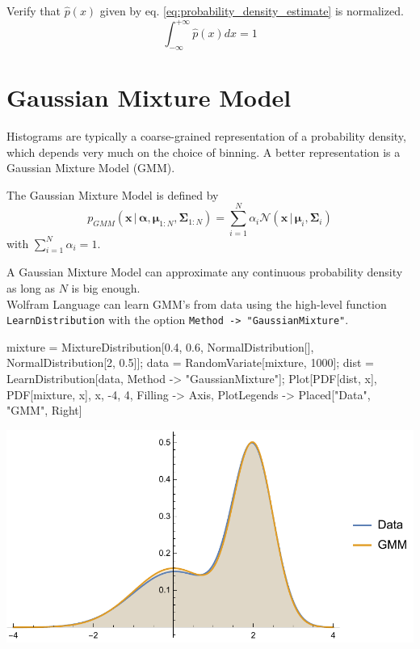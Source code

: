 \documentclass{tstextbook}
\begin{document}
\begin{exercise}
Verify that $\hat{p}(x)$ given by eq. \ref{eq:probability_density_estimate} is normalized.
  \begin{equation}
\int_{-\infty}^{+\infty}\hat{p}(x)dx=1        
  \end{equation}
\end{exercise}

\section{Gaussian Mixture Model}
Histograms are typically a coarse-grained representation of a probability density, which depends very much on the choice of binning. A better representation is a Gaussian Mixture Model (GMM). 

\begin{definition}
  \label{th:gaussianmixturemodel}
  The Gaussian Mixture Model is defined by
  \begin{equation}
    p_{GMM}(\mathbf{x}\,\vert\,\boldsymbol{\alpha},\boldsymbol{\mu}_{1:N},\boldsymbol{\Sigma}_{1:N}) = \sum_{i=1}^N \alpha_i \mathcal{N}\left(\mathbf{x}\,\vert\,\boldsymbol{\mu}_i,\boldsymbol{\Sigma}_i\right)
  \end{equation}
  with $\sum_{i=1}^N \alpha_i=1$.
\end{definition}

A Gaussian Mixture Model can approximate any continuous probability density as long as $N$ is big enough.\\

Wolfram Language can learn GMM's from data using the high-level function \texttt{LearnDistribution} with the option \texttt{Method -> "GaussianMixture"}.

\begin{mathematica}
mixture = MixtureDistribution[{0.4, 0.6},
             {NormalDistribution[], NormalDistribution[2, 0.5]}];
data = RandomVariate[mixture, 1000];
dist = LearnDistribution[data, Method -> "GaussianMixture"];
Plot[{PDF[dist, x], PDF[mixture, x]}, {x, -4, 4},
     Filling -> Axis, 
     PlotLegends -> Placed[{"Data", "GMM"}, Right] 
\end{mathematica}

 \includegraphics[scale=0.9, center]{images/gaussian_mixture_model.pdf}   
\end{document}
